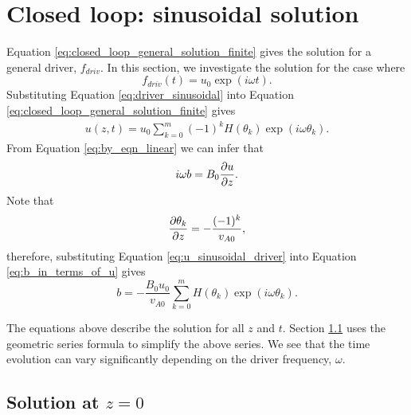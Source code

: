 \section{Closed loop: sinusoidal solution}
\label{sec:closed_loop_sinusoidal_solution}

Equation \eqref{eq:closed_loop_general_solution_finite} gives the solution for a general driver, $f_{driv}$. In this section, we investigate the solution for the case where
\begin{equation}
    \label{eq:driver_sinusoidal}
    f_{driv}(t)=u_0\exp(i\omega t).
\end{equation}
Substituting Equation \eqref{eq:driver_sinusoidal} into Equation \eqref{eq:closed_loop_general_solution_finite} gives
\begin{equation}
    \label{eq:u_sinusoidal_driver}
    \begin{aligned}
    u(z,t) = u_0\sum_{k=0}^{m}(-1)^kH(\theta_k)\exp(i\omega\theta_k).
    \end{aligned}
\end{equation}
From Equation \eqref{eq:by_eqn_linear} we can infer that
\begin{equation}
    \label{eq:b_in_terms_of_u}
    i\omega b = B_0\pdv{u}{z}.
\end{equation}
Note that
\[\pdv{\theta_k}{z}=-\frac{(-1)^k}{v_{A0}},\]
therefore, substituting Equation \eqref{eq:u_sinusoidal_driver} into Equation \eqref{eq:b_in_terms_of_u} gives
\begin{equation}
    b = -\frac{B_0u_0}{v_{A0}}\sum_{k=0}^{m}H(\theta_k)\exp(i\omega\theta_k).
\end{equation}

The equations above describe the solution for all $z$ and $t$. Section \ref{sec:soln_at_z=0} uses the geometric series formula to simplify the above series. We see that the time evolution can vary significantly depending on the driver frequency, $\omega$.

\subsection{Solution at \texorpdfstring{$z=0$}{z=0}}
\label{sec:soln_at_z=0}

